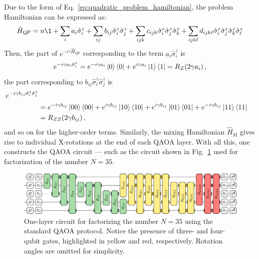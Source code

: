 Due to the form of Eq.~\eqref{eq:quadratic_problem_hamiltonian}, the problem Hamiltonian can be expressed as:
\begin{equation}
    \hat{H}_\mathrm{QP} = n \1 + \sum_i a_i \hat{\sigma}^z_i
    + \sum_{ij} b_{ij} \hat{\sigma}^z_i \hat{\sigma}^z_j
    + \sum_{ijk} c_{ijk} \hat{\sigma}^z_i \hat{\sigma}^z_j \hat{\sigma}^z_k
    + \sum_{ijk\ell} d_{ijk\ell} \hat{\sigma}^z_i \hat{\sigma}^z_j \hat{\sigma}^z_k \hat{\sigma}^z_\ell
    \label{eq:expanded_problem_quadratic_hamiltonian}
\end{equation}
Then, the part of $e^{-i \gamma \hat{H}_\mathrm{QP}}$ corresponding to the term $a_i \hat{\sigma}^z_i$ is
\begin{equation}
    e^{-i \gamma a_i \hat{\sigma}^z_i} = e^{-i \gamma a_i} \ket{0}\bra{0}
    + e^{i \gamma a_i} \ket{1}\bra{1}
    = R_Z(2 \gamma a_i)\,,
\end{equation}
the part corresponding to $b_{ij} \hat{\sigma}^z_i \hat{\sigma}^z_j$ is
\begin{equation}
    \begin{split}
        e^{-i \gamma b_{ij} \hat{\sigma}^z_i \hat{\sigma}^z_j} \\
         &=e^{-i\gamma b_{ij}} \ket{00}\bra{00} + e^{i\gamma b_{ij}} \ket{10}\bra{10}
        +  e^{i\gamma b_{ij}} \ket{01}\bra{01} + e^{-i\gamma b_{ij}} \ket{11}\bra{11} \\
        &= R_{ZZ} (2 \gamma b_{ij})\,,
    \end{split}
\end{equation}
and so on for the higher-order terms. Similarly, the mixing Hamiltonian $\hat{H}_\mathrm{M}$ gives rise to individual X-rotations at the end of each QAOA layer. With all this, one constructs the QAOA circuit --- such as the circuit shown in Fig.~\ref{fig:standard_circuit} used for factorization of the number $N=35$.

\begin{figure}[h]
    \centering
    \includegraphics[width=1\textwidth]{02-factorization/figs/standard_circuit_35.pdf}
    \caption{One-layer circuit for factorizing the number $N=35$ using the standard QAOA protocol. Notice the presence
    of three- and four-qubit gates, highlighted in yellow and red, respectively. Rotation angles are omitted for simplicity.}
    \label{fig:standard_circuit}
\end{figure}

